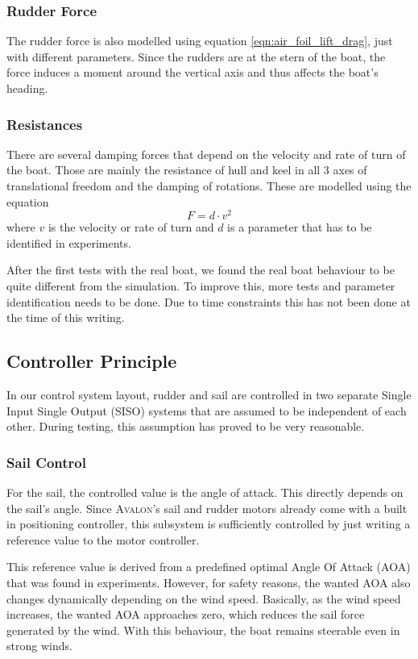 \subsubsection{Rudder Force}
The rudder force is also modelled using equation \ref{eqn:air_foil_lift_drag},
just with different parameters. Since the rudders are at the stern of the
boat, the force induces a moment around the vertical axis and thus affects the
boat's heading.
\subsubsection{Resistances}
There are several damping forces that depend on the velocity and rate of turn
of the boat. Those are mainly the resistance of hull and keel in all 3 axes of
translational freedom and the damping of rotations. These are modelled using
the equation
\begin{equation}
  F = d \cdot v^2
\end{equation}
where $v$ is the velocity or rate of turn and $d$ is a parameter that has to be
identified in experiments.

After the first tests with the real boat, we found the real boat behaviour to
be quite different from the simulation. To improve this, more tests and
parameter identification needs to be done. Due to time constraints this has not
been done at the time of this writing.

\subsection{Controller Principle}
In our control system layout, rudder and sail are controlled in two separate
Single Input Single Output (SISO) systems that are assumed to be independent of
each other. During testing, this assumption has proved to be very reasonable.

\subsubsection{Sail Control}
For the sail, the controlled value is the angle of attack. This directly
depends on the sail's angle. Since \textsc{Avalon}'s sail and rudder motors
already come with a built in positioning controller, this subsystem is
sufficiently controlled by just writing a reference value to the motor
controller.

This reference value is derived from a predefined optimal Angle Of Attack (AOA)
that was found in experiments. However, for safety reasons, the wanted AOA also
changes dynamically depending on the wind speed. Basically, as the wind speed
increases, the wanted AOA approaches zero, which reduces the sail force
generated by the wind. With this behaviour, the boat remains steerable even in
strong winds.

